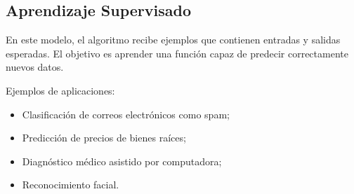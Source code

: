\subsection{Aprendizaje Supervisado}

En este modelo, el algoritmo recibe ejemplos que contienen entradas y salidas esperadas. El objetivo es
aprender una función capaz de predecir correctamente nuevos datos.

Ejemplos de aplicaciones:

\begin{itemize}
    \item Clasificación de correos electrónicos como spam;
    \item Predicción de precios de bienes raíces;
    \item Diagnóstico médico asistido por computadora;
    \item Reconocimiento facial.
\end{itemize}
 